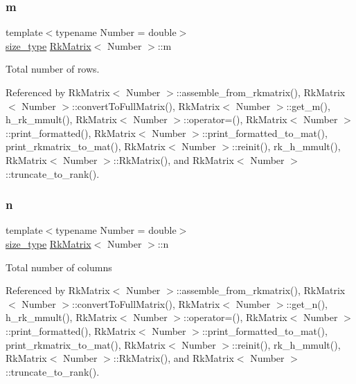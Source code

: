 \mbox{\label{classRkMatrix_a8ca8898bcfedeee135437833f83b144c}} 
\subsubsection{\texorpdfstring{m}{m}}
{\footnotesize\ttfamily template$<$typename Number = double$>$ \\
\hyperlink{classRkMatrix_add060bfc3a4cc77f858c3d6dd58cadd5}{size\+\_\+type} \hyperlink{classRkMatrix}{Rk\+Matrix}$<$ Number $>$\+::m\hspace{0.3cm}{\ttfamily [private]}}

Total number of rows. 

Referenced by Rk\+Matrix$<$ Number $>$\+::assemble\+\_\+from\+\_\+rkmatrix(), Rk\+Matrix$<$ Number $>$\+::convert\+To\+Full\+Matrix(), Rk\+Matrix$<$ Number $>$\+::get\+\_\+m(), h\+\_\+rk\+\_\+mmult(), Rk\+Matrix$<$ Number $>$\+::operator=(), Rk\+Matrix$<$ Number $>$\+::print\+\_\+formatted(), Rk\+Matrix$<$ Number $>$\+::print\+\_\+formatted\+\_\+to\+\_\+mat(), print\+\_\+rkmatrix\+\_\+to\+\_\+mat(), Rk\+Matrix$<$ Number $>$\+::reinit(), rk\+\_\+h\+\_\+mmult(), Rk\+Matrix$<$ Number $>$\+::\+Rk\+Matrix(), and Rk\+Matrix$<$ Number $>$\+::truncate\+\_\+to\+\_\+rank().

\mbox{\label{classRkMatrix_a06d3b6636bb423c391c66e4ccc722687}} 
\subsubsection{\texorpdfstring{n}{n}}
{\footnotesize\ttfamily template$<$typename Number = double$>$ \\
\hyperlink{classRkMatrix_add060bfc3a4cc77f858c3d6dd58cadd5}{size\+\_\+type} \hyperlink{classRkMatrix}{Rk\+Matrix}$<$ Number $>$\+::n\hspace{0.3cm}{\ttfamily [private]}}

Total number of columns 

Referenced by Rk\+Matrix$<$ Number $>$\+::assemble\+\_\+from\+\_\+rkmatrix(), Rk\+Matrix$<$ Number $>$\+::convert\+To\+Full\+Matrix(), Rk\+Matrix$<$ Number $>$\+::get\+\_\+n(), h\+\_\+rk\+\_\+mmult(), Rk\+Matrix$<$ Number $>$\+::operator=(), Rk\+Matrix$<$ Number $>$\+::print\+\_\+formatted(), Rk\+Matrix$<$ Number $>$\+::print\+\_\+formatted\+\_\+to\+\_\+mat(), print\+\_\+rkmatrix\+\_\+to\+\_\+mat(), Rk\+Matrix$<$ Number $>$\+::reinit(), rk\+\_\+h\+\_\+mmult(), Rk\+Matrix$<$ Number $>$\+::\+Rk\+Matrix(), and Rk\+Matrix$<$ Number $>$\+::truncate\+\_\+to\+\_\+rank().


